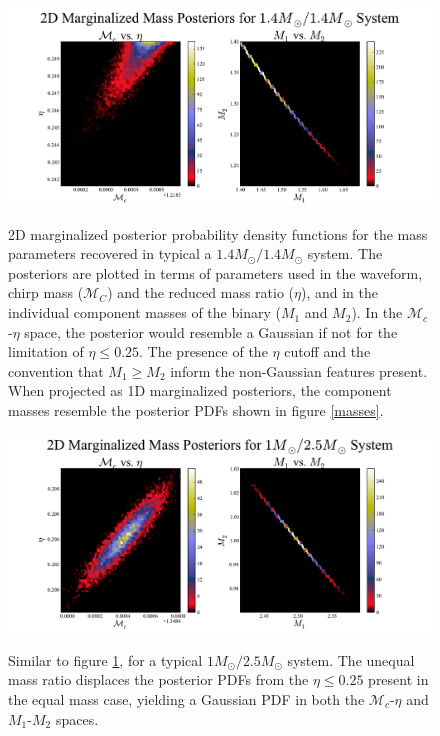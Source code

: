 \documentclass{emulateapj}
\begin{document}
\begin{figure}[h!]
  \centering
 \includegraphics[trim=2cm 0cm 2cm 0cm, clip=true,scale=0.63]{1414masses2D.pdf}
 \label{1414masses}
 \caption{2D marginalized posterior probability density functions for the mass parameters recovered in typical a $1.4M_{\odot}/1.4M_{\odot}$ system.  The posteriors are plotted in terms of parameters used in the waveform, chirp mass ($\mathcal{M}_C$) and the reduced mass ratio ($\eta$), and in the individual component masses of the binary ($M_1$ and $M_2$).  In the $\mathcal{M}_c$-$\eta$ space, the posterior would resemble a Gaussian if not for the limitation of $\eta \leq 0.25$.  The presence of the $\eta$ cutoff and the convention that $M_1 \geq M_2$ inform the non-Gaussian features present.  When projected as 1D marginalized posteriors, the component masses resemble the posterior PDFs shown in figure \ref{masses}.}
\end{figure}


\begin{figure}[h!]
  \centering
 \includegraphics[trim=2cm 0cm 2cm 0cm, clip=true,scale=0.63]{125masses2D.pdf}
 \label{125masses}
 \caption{Similar to figure \ref{1414masses}, for a typical $1M_{\odot}/2.5M_{\odot}$ system.  The unequal mass ratio displaces the posterior PDFs from the $\eta \leq 0.25$ present in the equal mass case, yielding a Gaussian PDF in both the $\mathcal{M}_c$-$\eta$ and $M_1$-$M_2$ spaces.}
\end{figure}
\end{document}
